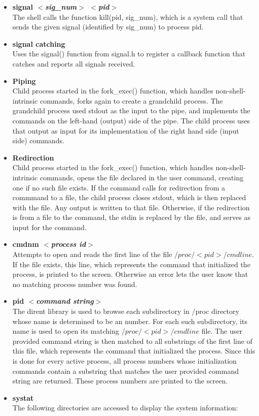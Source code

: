 \documentclass{article}
\begin{document}
\begin{itemize}
\item \textbf{signal $<$\textit{sig\_num}$>$ $<$\textit{pid}$>$}\\
The shell calls the function kill(pid, sig\_num), which is a system call that sends the given signal (identified by sig\_num) to process pid.

\item \textbf{signal catching}\\
Uses the signal() function from signal.h to register a callback function that catches and reports all signals received.

\item \textbf{Piping}\\
Child process started in the fork\_exec() function, which handles non-shell-intrinsic commands, forks again to create a grandchild process.  The grandchild process used stdout as the input to the pipe, and implements the commands on the left-hand (output) side of the pipe. The child process uses that output as input for its implementation of the right hand side (input side) commands.


\item \textbf{Redirection}\\
Child process started in the fork\_exec() function, which handles non-shell-intrinsic commands, opens the file declared in the user command, creating one if no such file exists.  If the command calls for redirection from a commmand to a file, the child process closes stdout, which is then replaced with the file. Any output is written to that file.  Otherwise, if the redirection is from a file to the command, the stdin is replaced by the file, and serves as input for the command.

\item \textbf{cmdnm $<$\textit{process id}$>$}\\
Attempts to open and reads the first line of the file $/proc/<pid>/cmdline$.  If the file exists, this line, which represents the command that initialized the process, is printed to the screen.  Otherwise an error lets the user know that no matching process number was found.\\
\item \textbf{pid \textit{$<$command string$>$}}\\
The dirent library is used to browse each subdirectory in /proc directory whose name is determined to be an number.  For each such subdirectory, its name is used to open its matching $/proc/<pid>/cmdline$ file.  The user provided command string is then matched to all substrings of the first line of this file, which represents the command that initialized the process. Since this is done for every active process, all process numbers whose initialization commands contain a substring that matches the user provided command string are returned. These process numbers are printed to the screen.\\
\item \textbf{systat}\\
The following directories are accessed to display the system information:


\end{itemize}
\end{document}
